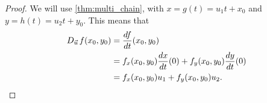 
\begin{proof}
We will use \autoref{thm:multi_chain}, with $x=g(t)=u_1t+x_0$ and $y=h(t)=u_2t+y_0$.  This means that
\begin{align*}
D_{\vec u\,}f(x_0,y_0)
&=\frac{df}{dt}(x_0,y_0)\\
&=f_x(x_0,y_0)\frac{dx}{dt}(0)+f_y(x_0,y_0)\frac{dy}{dt}(0)\\
&=f_x(x_0,y_0)u_1 + f_y(x_0,y_0)u_2.\qedhere
\end{align*}
\end{proof}


